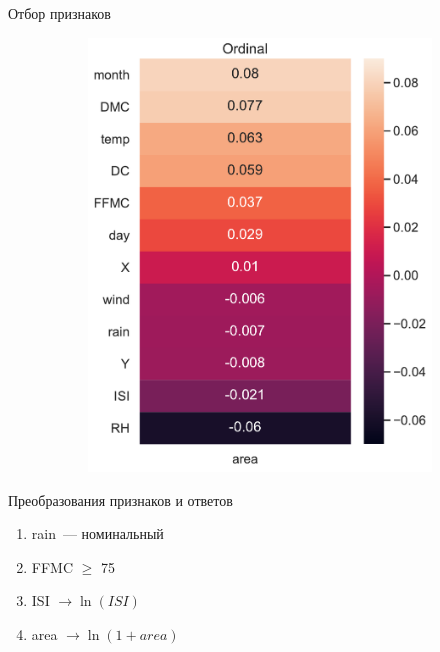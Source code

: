 \documentclass{beamer} %
\begin{document}
\begin{frame}{Отбор признаков}
\begin{figure}
\begin{subfigure}[b]{0.475\textwidth}
                \includegraphics[width=\textwidth]{features_corr.pdf}
            \end{subfigure}
        \end{figure}
    \end{frame}

    \begin{frame}{Преобразования признаков и ответов}
        \begin{enumerate}
            \item rain~--- номинальный
            \item FFMC $\geq$ 75
            \item ISI $\to \ln(ISI)$
            \item area $\to \ln(1 + area)$
        \end{enumerate}
    \end{frame}
\end{document}
